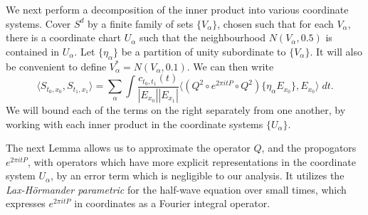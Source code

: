 \documentclass[dvipsnames,letterpaper,12pt]{article}
\begin{document}
We next perform a decomposition of the inner product into various coordinate systems. Cover $S^d$ by a finite family of sets $\{ V_\alpha \}$, chosen such that for each $V_\alpha$, there is a coordinate chart $U_\alpha$ such that the neighbourhood $N(V_\alpha, 0.5)$ is contained in $U_\alpha$. Let $\{ \eta_\alpha \}$ be a partition of unity subordinate to $\{ V_\alpha \}$. It will also be convenient to define $V_\alpha^* = N(V_\alpha, 0.1)$. We can then write
%
\[ \langle S_{t_0,x_0}, S_{t_1,x_1} \rangle = \sum_\alpha \int \frac{c_{t_0,t_1}(t)}{|E_{x_0}||E_{x_1}|} \big\langle (Q^2 \circ e^{2 \pi i t P} \circ Q^2) \{ \eta_\alpha E_{x_0} \}, E_{x_0} \big\rangle\; dt. \]
%
We will bound each of the terms on the right separately from one another, by working with each inner product in the coordinate systems $\{ U_\alpha \}$.

The next Lemma allows us to approximate the operator $Q$, and the propogators $e^{2 \pi i t P}$, with operators which have more explicit representations in the coordinate system $U_\alpha$, by an error term which is negligible to our analysis. It utilizes the \emph{Lax-H\"{o}rmander parametric} for the half-wave equation over small times, which expresses $e^{2 \pi i t P}$ in coordinates as a Fourier integral operator.

\end{document}
